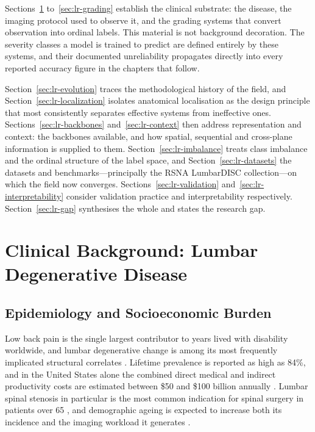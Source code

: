Sections~\ref{sec:lr-clinical} to~\ref{sec:lr-grading} establish the clinical
substrate: the disease, the imaging protocol used to observe it, and the
grading systems that convert observation into ordinal labels. This material is
not background decoration. The severity classes a model is trained to predict
are defined entirely by these systems, and their documented unreliability
propagates directly into every reported accuracy figure in the chapters that
follow.

Section~\ref{sec:lr-evolution} traces the methodological history of the field,
and Section~\ref{sec:lr-localization} isolates anatomical localisation as the
design principle that most consistently separates effective systems from
ineffective ones. Sections~\ref{sec:lr-backbones} and~\ref{sec:lr-context} then
address representation and context: the backbones available, and how spatial,
sequential and cross-plane information is supplied to them.
Section~\ref{sec:lr-imbalance} treats class imbalance and the ordinal structure
of the label space, and Section~\ref{sec:lr-datasets} the datasets and
benchmarks---principally the RSNA LumbarDISC collection---on which the field now
converges. Sections~\ref{sec:lr-validation} and~\ref{sec:lr-interpretability}
consider validation practice and interpretability respectively.
Section~\ref{sec:lr-gap} synthesises the whole and states the research gap.

\section{Clinical Background: Lumbar Degenerative Disease}
\label{sec:lr-clinical}

\subsection{Epidemiology and Socioeconomic Burden}
\label{sec:lr-epidemiology}

Low back pain is the single largest contributor to years lived with disability
worldwide, and lumbar degenerative change is among its most frequently
implicated structural correlates \cite{compte2023are,zheng2022deep}. Lifetime
prevalence is reported as high as 84\%, and in the United States alone the
combined direct medical and indirect productivity costs are estimated between
\$50 and \$100 billion annually \cite{richards2026the}. Lumbar spinal stenosis
in particular is the most common indication for spinal surgery in patients over
65 \cite{schizas2010qualitative,bharadwaj2023deep}, and demographic ageing is
expected to increase both its incidence and the imaging workload it generates
\cite{lee2024artificial}.

